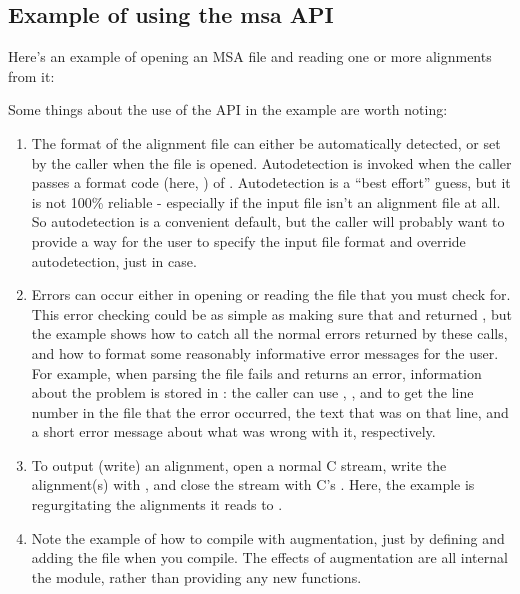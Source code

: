 \subsection{Example of using the msa API}

Here's an example of opening an MSA file and reading one or more
alignments from it:



Some things about the use of the API in the example are worth noting:

\begin{enumerate}
\item The format of the alignment file can either be automatically
      detected, or set by the caller when the file is opened.
      Autodetection is invoked when the caller passes a format code
      (here, ) of
      . Autodetection is a ``best effort''
      guess, but it is not 100\% reliable - especially if the input
      file isn't an alignment file at all. So autodetection is a
      convenient default, but the caller will probably want to provide
      a way for the user to specify the input file format and override
      autodetection, just in case.

\item Errors can occur either in opening or reading the file that you
      must check for. This error checking could be as simple as making
      sure that  and
       returned , but the example
      shows how to catch all the normal errors returned by these
      calls, and how to format some reasonably informative error
      messages for the user. For example, when parsing the file fails
      and  returns an 
      error, information about the problem is stored in :
      the caller can use , ,
      and  to get the line number in the file that
      the error occurred, the text that was on that line, and a short
      error message about what was wrong with it, respectively.

\item To output (write) an alignment, open a normal C 
      stream, write the alignment(s) with ,
      and close the stream with C's . Here, the
      example is regurgitating the alignments it reads to
      .

\item Note the example of how to compile with 
      augmentation, just by defining  and
      adding the  file when you compile. The
      effects of  augmentation are all internal the
       module, rather than providing any new functions.
\end{enumerate}

